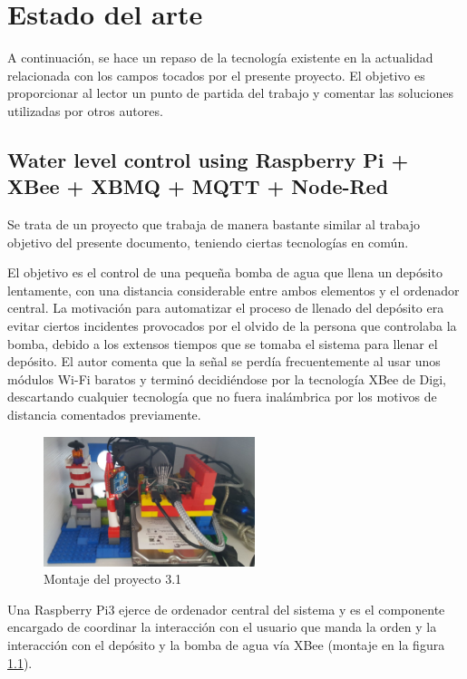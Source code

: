 \chapter{Estado del arte}

A continuación, se hace un repaso de la tecnología existente en la actualidad relacionada con los campos tocados por el presente proyecto. El objetivo es proporcionar al lector un punto de partida del trabajo y comentar las soluciones utilizadas por otros autores. 

\section{Water level control using Raspberry Pi + XBee + XBMQ + MQTT + Node-Red \cite{zhivazhiva:RaspberryPi}}

Se trata de un proyecto que trabaja de manera bastante similar al trabajo objetivo del presente documento, teniendo ciertas tecnologías en común.

El objetivo es el control de una pequeña bomba de agua que llena un depósito lentamente, con una distancia considerable entre ambos elementos y el ordenador central. La motivación para automatizar el proceso de llenado del depósito era evitar ciertos incidentes provocados por el olvido de la persona que controlaba la bomba, debido a los extensos tiempos que se tomaba el sistema para llenar el depósito. El autor comenta que la señal se perdía frecuentemente al usar unos módulos Wi-Fi baratos y terminó decidiéndose por la tecnología XBee de Digi, descartando cualquier tecnología que no fuera inalámbrica por los motivos de distancia comentados previamente.

\begin{figure}[tb]
\centering
\includegraphics[width=0.55\textwidth]{figuras/EArte1.png}
\caption{Montaje del proyecto 3.1}
\label{fig:EArte1}
\end{figure}

Una Raspberry Pi3 ejerce de ordenador central del sistema y es el componente encargado de coordinar la interacción con el usuario que manda la orden y la interacción con el depósito y la bomba de agua vía XBee (montaje en la figura \ref{fig:EArte1}).

